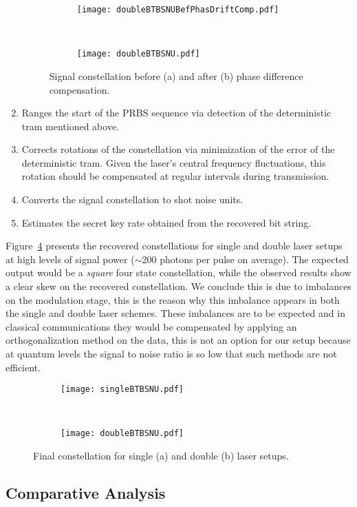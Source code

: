 \begin{enumerate}
\begin{figure}[h]
\centering
\begin{subfigure}{.45\linewidth}
\texttt{[image: doubleBTBSNUBefPhasDriftComp.pdf]}
\caption{}
\label{fig:phasedriftA}
\end{subfigure}
~
\begin{subfigure}{.45\linewidth}
\texttt{[image: doubleBTBSNU.pdf]}
\caption{}
\label{fig:phasedriftB}
\end{subfigure}
\caption{Signal constellation before (a) and after (b) phase difference compensation.}
\label{fig:driftCompens}
\end{figure}
\item Ranges the start of the PRBS sequence via detection of the deterministic tram mentioned above.
\item Corrects rotations of the constellation via minimization of the error of the deterministic tram. Given the laser's central frequency fluctuations, this rotation should be compensated at regular intervals during transmission.
\item Converts the signal constellation to shot noise units.
\item Estimates the secret key rate obtained from the recovered bit string.
\end{enumerate}
\par
Figure~\ref{fig:recConst} presents the recovered constellations for single and double laser setups at high levels of signal power ($\sim$200 photons per pulse on average). The expected output would be a \textit{square} four state constellation, while the observed results show a clear skew on the recovered constellation. We conclude this is due to imbalances on the modulation stage, this is the reason why this imbalance appears in both the single and double laser schemes. These imbalances are to be expected and in classical communications they would be compensated by applying an orthogonalization method on the data, this is not an option for our setup because at quantum levels the signal to noise ratio is so low that such methods are not efficient.
\begin{figure}[h]
\centering
\begin{subfigure}{.45\linewidth}
\texttt{[image: singleBTBSNU.pdf]}
\caption{}
\end{subfigure}
~
\begin{subfigure}{.45\linewidth}
\texttt{[image: doubleBTBSNU.pdf]}
\caption{}
\end{subfigure}
\caption{Final constellation for single (a) and double (b) laser setups.}
\label{fig:recConst}
\end{figure}

\subsection{Comparative Analysis}


 

